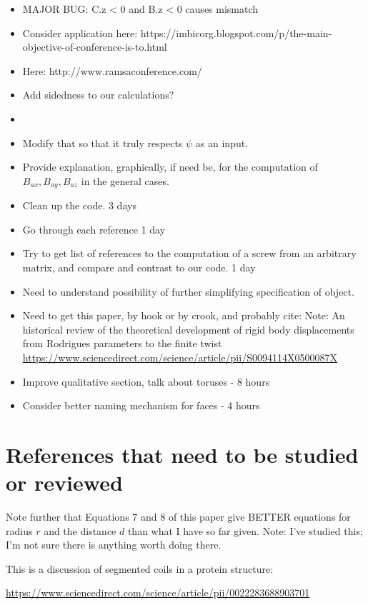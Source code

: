 \documentclass[11pt]{article}
\begin{document}
{\begin{itemize}
  \item MAJOR BUG: C.z < 0 and B.z < 0 causes mismatch
\item Consider application here: https://imbicorg.blogspot.com/p/the-main-objective-of-conference-is-to.html
  \item Here: http://www.ramsaconference.com/
\item Add sidedness to our calculations?
  \item
  \item Modify that so that it truly respects $\psi$ as an input.
\item Provide explanation, graphically, if need be, for
  the computation of $B_{ax}, B_{ay}, B_{az}$ in the general cases.
\item Clean up the code. 3 days
\item Go through each reference 1 day
\item Try to get list of references to the computation of a screw from an arbitrary matrix, and compare and contrast to our code. 1 day
\item Need to understand possibility of further simplifying specification of object.

\item Need to get this paper, by hook or by crook, and probably cite:
  Note: An historical review of the theoretical development of rigid body displacements from Rodrigues parameters to the finite twist
  \url{https://www.sciencedirect.com/science/article/pii/S0094114X0500087X}
  \item Improve qualitative section, talk about toruses - 8 hours
  \item Consider better naming mechanism for faces - 4 hours
  \end{itemize}

\section{References that need to be studied or reviewed}


Note further that Equations 7 and 8 of this paper\cite{kahn1989defining} give BETTER equations for radius $r$ and the distance $d$ than what I have so far given. Note: I've studied this; I'm not sure there is anything worth doing there.

This is a discussion of segmented coils in a protein structure:

\url{https://www.sciencedirect.com/science/article/pii/0022283688903701}

}
\end{document}
